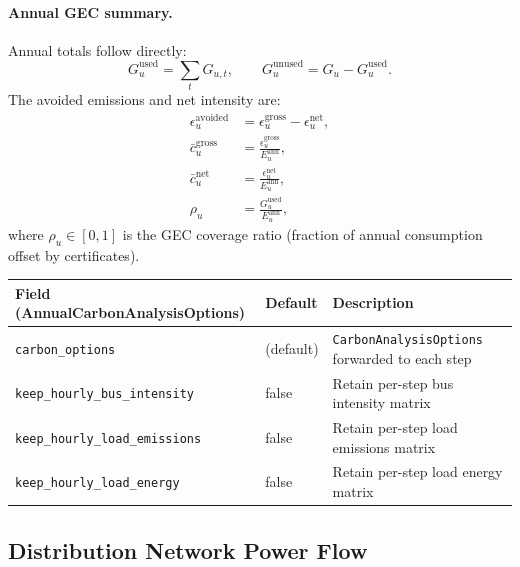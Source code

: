 \paragraph{Annual GEC summary.}
Annual totals follow directly:
\begin{equation}
  G_u^{\text{used}} = \sum_t G_{u,t}, \qquad
  G_u^{\text{unused}} = G_u - G_u^{\text{used}}.
\end{equation}
The avoided emissions and net intensity are:
\begin{align}
  \epsilon_u^{\text{avoided}} &= \epsilon_u^{\text{gross}} - \epsilon_u^{\text{net}}, \\
  \bar{c}_u^{\text{gross}}    &= \frac{\epsilon_u^{\text{gross}}}{E_u^{\text{ann}}}, \\
  \bar{c}_u^{\text{net}}      &= \frac{\epsilon_u^{\text{net}}}{E_u^{\text{ann}}}, \\
  \rho_u                      &= \frac{G_u^{\text{used}}}{E_u^{\text{ann}}},
  \label{eq:gec-coverage}
\end{align}
where $\rho_u \in [0,1]$ is the GEC coverage ratio (fraction of annual
consumption offset by certificates).

\begin{center}
\begin{tabular}{lll}
\hline\hline
\textbf{Field (AnnualCarbonAnalysisOptions)} & \textbf{Default} & \textbf{Description} \\
\hline
\texttt{carbon\_options} & (default) & \texttt{CarbonAnalysisOptions} forwarded to each step \\
\texttt{keep\_hourly\_bus\_intensity} & false & Retain per-step bus intensity matrix \\
\texttt{keep\_hourly\_load\_emissions} & false & Retain per-step load emissions matrix \\
\texttt{keep\_hourly\_load\_energy} & false & Retain per-step load energy matrix \\
\hline\hline
\end{tabular}
\end{center}

\subsection{Distribution Network Power Flow}
\label{sec:dist-pf}


